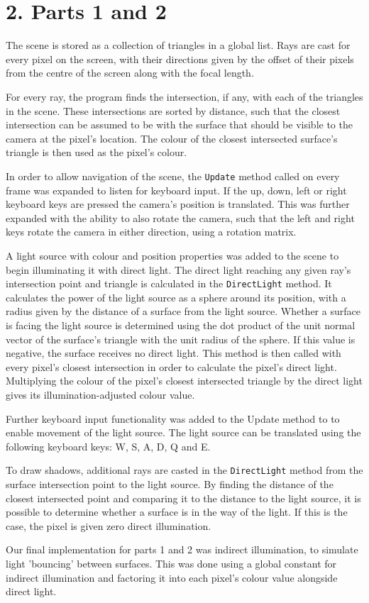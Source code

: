 \documentclass[DIV=calc, paper=a4, fontsize=11pt, twocolumn]{article}	 %
\begin{document}
	\section*{2. Parts 1 and 2}
	The scene is stored as a collection of triangles in a global list. Rays are cast for every pixel on the screen, with their directions given by the offset of their pixels from the centre of the screen along with the focal length. \par
	For every ray, the program finds the intersection, if any, with each of the triangles in the scene. These intersections are sorted by distance, such that the closest intersection can be assumed to be with the surface that should be visible to the camera at the pixel's location. The colour of the closest intersected surface's triangle is then used as the pixel's colour. \par
	In order to allow navigation of the scene, the \texttt{Update} method called on every frame was expanded to listen for keyboard input. If the up, down, left or right keyboard keys are pressed the camera's position is translated. This was further expanded with the ability to also rotate the camera, such that the left and right keys rotate the camera in either direction, using a rotation matrix. \par
	A light source with colour and position properties was added to the scene to begin illuminating it with direct light. The direct light reaching any given ray's intersection point and triangle is calculated in the \texttt{DirectLight} method. It calculates the power of the light source as a sphere around its position, with a radius given by the distance of a surface from the light source. Whether a surface is facing the light source is determined using the dot product of the unit normal vector of the surface's triangle with the unit radius of the sphere. If this value is negative, the surface receives no direct light. This method is then called with every pixel's closest intersection in order to calculate the pixel's direct light. Multiplying the colour of the pixel's closest intersected triangle by the direct light gives its illumination-adjusted colour value. \par
	Further keyboard input functionality was added to the Update method to to enable movement of the light source. The light source can be translated using the following keyboard keys: W, S, A, D, Q and E. \par
	To draw shadows, additional rays are casted in the \texttt{DirectLight} method from the surface intersection point to the light source. By finding the distance of the closest intersected point and comparing it to the distance to the light source, it is possible to determine whether a surface is in the way of the light. If this is the case, the pixel is given zero direct illumination. \par
	Our final implementation for parts 1 and 2 was indirect illumination, to simulate light 'bouncing' between surfaces. This was done using a global constant for indirect illumination and factoring it into each pixel's colour value alongside direct light. 
		
\end{document}

